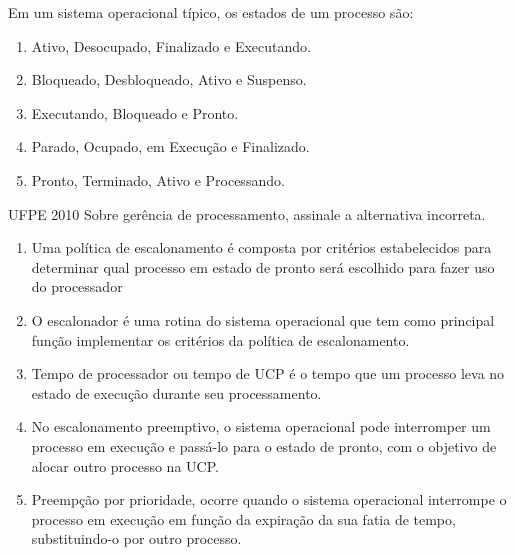 \documentclass[aspectratio=169,
				xcolor=table]{beamer}
\begin{document}
	\begin{frame}{}
	Em um sistema operacional típico, os estados de um processo são:
		\begin{enumerate}[a]
			\item Ativo, Desocupado, Finalizado e Executando.
			\item Bloqueado, Desbloqueado, Ativo e Suspenso.
			\item \alert{Executando, Bloqueado e Pronto.}
			\item Parado, Ocupado, em Execução e Finalizado.
			\item Pronto, Terminado, Ativo e Processando.			
		\end{enumerate}
	\end{frame}


	\begin{frame}{UFPE 2010}
		Sobre gerência de processamento, assinale a alternativa incorreta.
		\begin{enumerate}[a]
			\item Uma política de escalonamento é composta por critérios estabelecidos para determinar qual processo em estado de pronto será escolhido para fazer uso do processador
			\item O escalonador é uma rotina do sistema operacional que tem como principal função implementar os critérios da política de escalonamento.
			\item Tempo de processador ou tempo de UCP é o tempo que um processo leva no estado de execução durante seu processamento.
			\item No escalonamento preemptivo, o sistema operacional pode interromper um processo em execução e passá-lo para o estado de pronto, com o objetivo de alocar outro processo na UCP.
			\item Preempção por prioridade, ocorre quando o sistema operacional interrompe o processo em execução em função da expiração da sua fatia de tempo, substituindo-o por outro processo.			
		\end{enumerate}
	\end{frame}
	
\end{document}
